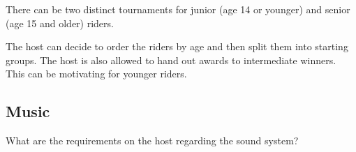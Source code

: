 There can be two distinct tournaments for junior (age 14 or younger) and senior (age 15 and older) riders.

The host can decide to order the riders by age and then split them into starting groups.
The host is also allowed to hand out awards to intermediate winners.
This can be motivating for younger riders.

\begin{comment-2016}
\section{Music}

What are the requirements on the host regarding the sound system?
\end{comment-2016}
